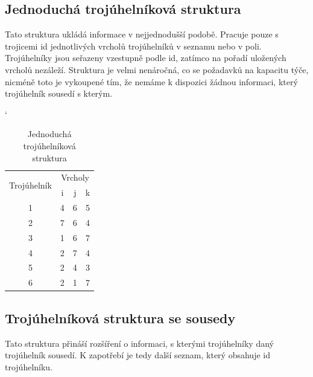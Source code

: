 \documentclass[12pt,a4paper]{article}
\begin{document}
\newpage
\subsection{Jednoduchá trojúhelníková struktura}
Tato struktura ukládá informace v nejjednodušší podobě. Pracuje pouze s trojicemi id jednotlivých vrcholů trojúhelníků v seznamu nebo v poli. Trojúhelníky jsou seřazeny vzestupně podle id, zatímco na pořadí uložených vrcholů nezáleží. Struktura je velmi nenáročná, co se požadavků na kapacitu týče, nicméně toto je vykoupené tím, že nemáme k dispozici žádnou informaci, který trojúhelník sousedí s kterým.

\begin{table}[h]
\catcode`
\begin{tabular}{|c||c|c|c|}
\hline
\multirow{2}{*}{Trojúhelník} & \multicolumn{3}{c|}{Vrcholy} \\ \cline{2-4} 
                             & i        & j       & k       \\ \hline \hline
1                            & 4        & 6       & 5       \\ \hline
2                            & 7        & 6       & 4       \\ \hline
3                            & 1        & 6       & 7       \\ \hline
4                            & 2        & 7       & 4       \\ \hline
5                            & 2        & 4       & 3       \\ \hline
6                            & 2        & 1       & 7       \\ \hline
\end{tabular}
\caption{Jednoduchá trojúhelníková struktura}
\label{tab:troj_struktura_simple}
\end{table}



\subsection{Trojúhelníková struktura se sousedy}

Tato struktura přináší rozšíření o informaci, s kterými trojúhelníky daný trojúhelník sousedí. K zapotřebí je tedy další seznam, který obsahuje id trojúhelníku.
\end{document}

